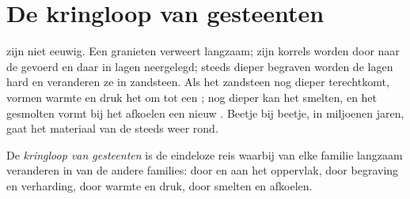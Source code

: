 \section{De kringloop van gesteenten}

 zijn niet eeuwig. Een granieten  verweert langzaam; zijn
korrels worden door  naar de  gevoerd en daar in lagen
neergelegd; steeds dieper begraven worden de lagen hard en veranderen ze
in zandsteen. Als het zandsteen nog dieper terechtkomt, vormen warmte en
druk het om tot een ; nog dieper kan het smelten, en het
gesmolten  vormt bij het afkoelen een nieuw .
Beetje bij beetje, in miljoenen jaren, gaat het materiaal van de
 steeds weer rond.

\begin{definition}\label{def:g6:rocks-and-minerals:rock-cycle}
De \emph{kringloop van gesteenten} is de
eindeloze reis waarbij  van elke familie langzaam veranderen in
 van de andere families: door  en  aan het
oppervlak, door begraving en verharding, door warmte en druk, door smelten
en afkoelen.
\end{definition}

